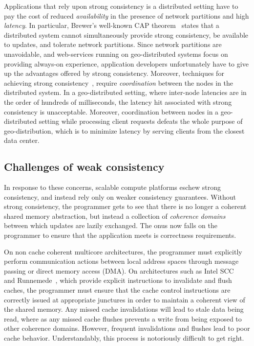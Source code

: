 Applications that rely upon strong consistency is a distributed setting have to
pay the cost of reduced \emph{availability} in the presence of network
partitions and high \emph{latency}. In particular, Brewer's well-known CAP
theorem~\cite{Brewer2000,Brewer2012,Gilbert2002} states that a distributed
system cannot simultaneously provide strong consistency, be available to
updates, and tolerate network partitions. Since network partitions are
unavoidable, and web-services running on geo-distributed systems focus on
providing always-on experience, application developers unfortunately have to
give up the advantages offered by strong consistency. Moreover, techniques for
achieving strong consistency~\cite{Burrows2006, Traiger1982, Lamport98,
Defago2004}, require \emph{coordination} between the nodes in the distributed
system. In a geo-distributed setting, where inter-node latencies are in the
order of hundreds of milliseconds, the latency hit associated with strong
consistency is unacceptable. Moreover, coordination between nodes in a
geo-distributed setting while processing client requests defeats the whole
purpose of geo-distribution, which is to minimize latency by serving clients
from the closest data center.

\subsection{Challenges of weak consistency}

In response to these concerns, scalable compute platforms eschew strong
consistency, and instead rely only on weaker consistency guarantees. Without
strong consistency, the programmer gets to see that there is no longer a
coherent shared memory abstraction, but instead a collection of \emph{coherence
domains} between which updates are lazily exchanged. The onus now falls on the
programmer to ensure that the application meets is correctness requirements.

On non cache coherent multicore architectures, the programmer must explicitly
perform communication actions between local address spaces through message
passing or direct memory access (DMA). On architectures such as Intel
SCC~\cite{Mattson2010} and Runnemede~\cite{Carter2013}, which provide explicit
instructions to invalidate and flush caches, the programmer must ensure that
the cache control instructions are correctly issued at appropriate junctures in
order to maintain a coherent view of the shared memory. Any missed cache
invalidations will lead to stale data being read, where as any missed cache
flushes prevents a write from being exposed to other coherence domains.
However, frequent invalidations and flushes lead to poor cache behavior.
Understandably, this process is notoriously difficult to get right.

